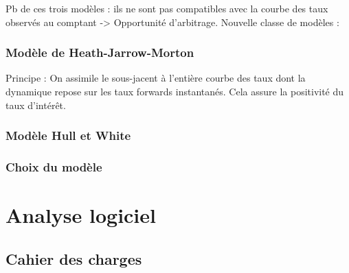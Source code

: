\documentclass[french,12pt,a4paper]{article}
\begin{document}
Pb de ces trois modèles : ils ne sont pas compatibles avec la courbe des taux observés au comptant -> Opportunité d'arbitrage. Nouvelle classe de modèles : \\

\subsubsection{Modèle de Heath-Jarrow-Morton}
Principe : On assimile le sous-jacent à l'entière courbe des taux dont la dynamique repose sur les taux forwards instantanés. Cela assure la positivité du taux d'intérêt.

\subsubsection{Modèle Hull et White}

\subsubsection{Choix du modèle}

\section{Analyse logiciel}

\subsection{Cahier des charges}
\end{document}

